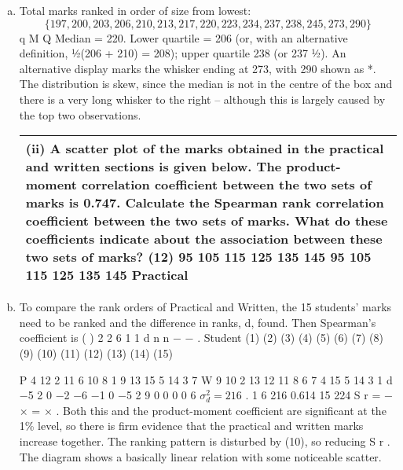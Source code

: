 \documentclass[a4paper,12pt]{article}
\begin{document}
\begin{enumerate}[(a)]
\item  Total marks ranked in order of size from lowest:
\[\{197, 200, 203, 206, 210, 213, 217, 220, 223, 234, 237, 238, 245, 273, 290\}\]
q M Q
Median = 220. Lower quartile = 206 (or, with an alternative definition, ½(206 + 210)
= 208); upper quartile 238 (or 237 ½).
An alternative display marks the whisker ending at 273, with 290 shown as *. The
distribution is skew, since the median is not in the centre of the box and there is a very
long whisker to the right – although this is largely caused by the top two observations.

\newpage

\begin{table}[ht!]
 
\centering
 
\begin{tabular}{|p{15cm}|}
 
\hline  


(ii) A scatter plot of the marks obtained in the practical and written sections is given below.  
The product-moment correlation coefficient between the two sets of marks is 0.747.  
Calculate the Spearman rank correlation coefficient between the two sets of marks.  
What do these coefficients indicate about the association between these two sets of marks? (12) 
95 105 115 125 135 145
95
105
115
125
135
145
Practical
\\ \hline
  
\end{tabular}

\end{table} 
\item To compare the rank orders of Practical and Written, the 15 students' marks
need to be ranked and the difference in ranks, d, found. Then Spearman's coefficient
is ( )
2
2
6
1
1
d
n n
−
−
\sigma .
Student (1) (2) (3) (4) (5) (6) (7) (8) (9) (10) (11) (12) (13) (14) (15)

P 4 12 2 11 6 10 8 1 9 13 15 5 14 3 7
W 9 10 2 13 12 11 8 6 7 4 15 5 14 3 1
d −5 2 0 −2 −6 −1 0 −5 2 9 0 0 0 0 6
$\sigma_d^2 = 216$ . 1 6 216 0.614
15 224 S r = − × =
×
.
Both this and the product-moment coefficient are significant at the 1\% level, so there
is firm evidence that the practical and written marks increase together. The ranking
pattern is disturbed by (10), so reducing S r . The diagram shows a basically linear
relation with some noticeable scatter.


\end{enumerate}
\end{document}
